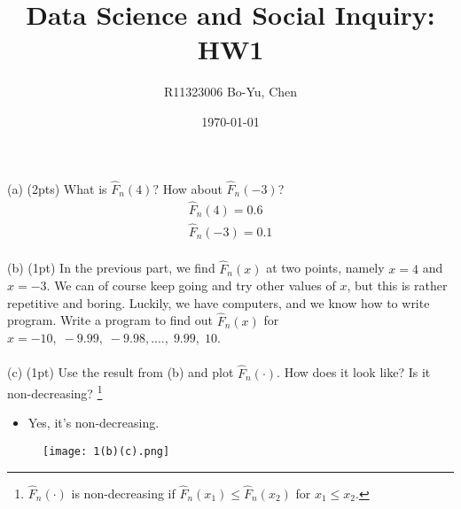 \documentclass[11pt, oneside]{article}   	%
\title{Data Science and Social Inquiry: HW1}
\author{
	R11323006 Bo-Yu, Chen
}
\date{\today}
\begin{document}
\maketitle

\paragraph{}
(a) (2pts) What is $\hat{F}_n(4)?$ How about $\hat{F}_n(-3)$?
\begin{align*}
\hat{F}_n(4) = 0.6\\
\hat{F}_n(-3) = 0.1
\end{align*}




\paragraph{}
(b) (1pt) In the previous part, we find $\hat{F}_n(x)$ at two points, 
namely $x=4$ and $x=-3$. We can of course keep going and try other values of $x$, 
but this is rather repetitive and boring. 
Luckily, we have computers, and we know how to write program. 
Write a program to find out 
$\hat{F}_n(x)$ for $x = -10, \;-9.99, \;-9.98, ...., \;9.99, \;10$.





\paragraph{}
(c) (1pt) Use the result from (b) and plot $\hat{F}_n(\cdot)$. 
How does it look like? Is it non-decreasing?
\footnote{$\hat{F}_n(\cdot)$ is non-decreasing if $\hat{F}_n(x_1) \leq \hat{F}_n(x_2)$ for $x_1 \leq x_2 $.} 

\begin{itemize}
    \item[] 
    Yes, it's non-decreasing.
\end{itemize}

\begin{figure}[htbp]
	\centering
	\texttt{[image: 1(b)(c).png]}
\end{figure}
\end{document}
